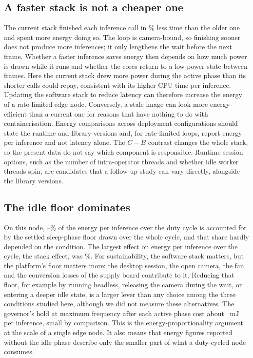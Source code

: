 \documentclass[10pt,journal,compsoc]{IEEEtran}
\begin{document}
\subsection{A faster stack is not a cheaper one}
The current stack finished each inference call in \StackTimeSavedPct\% less time than the older one and spent more energy doing so. The loop is camera-bound, so finishing sooner does not produce more inferences; it only lengthens the wait before the next frame. Whether a faster inference saves energy then depends on how much power is drawn while it runs and whether the cores return to a low-power state between frames. Here the current stack drew more power during the active phase than its shorter calls could repay, consistent with its higher CPU time per inference. Updating the software stack to reduce latency can therefore increase the energy of a rate-limited edge node. Conversely, a stale image can look more energy-efficient than a current one for reasons that have nothing to do with containerisation. Energy comparisons across deployment configurations should state the runtime and library versions and, for rate-limited loops, report energy per inference and not latency alone. The $C-B$ contrast changes the whole stack, so the present data do not say which component is responsible. Runtime session options, such as the number of intra-operator threads and whether idle worker threads spin, are candidates that a follow-up study can vary directly, alongside the library versions.

\subsection{The idle floor dominates}
On this node, \EBaseShareLo--\EBaseShareHi\% of the energy per inference over the duty cycle is accounted for by the settled sleep-phase floor drawn over the whole cycle, and that share hardly depended on the condition. The largest effect on energy per inference over the cycle, the stack effect, was \ECycCBpctabs\%. For sustainability, the software stack matters, but the platform's floor matters more: the desktop session, the open camera, the fan and the conversion losses of the supply board contribute to it. Reducing that floor, for example by running headless, releasing the camera during the wait, or entering a deeper idle state, is a larger lever than any choice among the three conditions studied here, although we did not measure these alternatives. The governor's hold at maximum frequency after each active phase cost about \HoldmJ~mJ per inference, small by comparison. This is the energy-proportionality argument~\cite{barroso2007case} at the scale of a single edge node. It also means that energy figures reported without the idle phase describe only the smaller part of what a duty-cycled node consumes.
\end{document}
